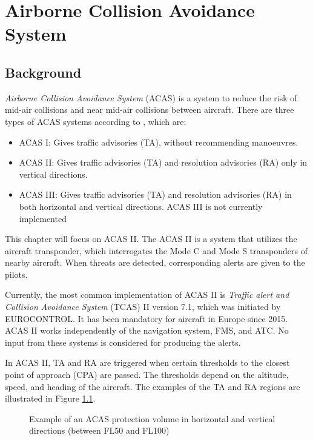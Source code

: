 \chapter{Airborne Collision Avoidance System}

\section{Background}

\emph{Airborne Collision Avoidance System} (ACAS) is a system to reduce the risk of mid-air collisions and near mid-air collisions between aircraft. There are three types of ACAS systems according to \cite{icaoA10V4}, which are:

\begin{itemize}
  \item ACAS I: Gives traffic advisories (TA), without recommending manoeuvres.
  \item ACAS II: Gives traffic advisories (TA) and resolution advisories (RA) only in vertical directions.
  \item ACAS III: Gives traffic advisories (TA) and resolution advisories (RA) in both horizontal and vertical directions. ACAS III is not currently implemented
\end{itemize}

This chapter will focus on ACAS II. The ACAS II is a system that utilizes the aircraft transponder, which interrogates the Mode C and Mode S transponders of nearby aircraft. When threats are detected, corresponding alerts are given to the pilots.

Currently, the most common implementation of ACAS II is \emph{Traffic alert and Collision Avoidance System} (TCAS) II version 7.1, which was initiated by EUROCONTROL. It has been mandatory for aircraft in Europe since 2015. ACAS II works independently of the navigation system, FMS, and ATC. No input from these systems is considered for producing the alerts.

In ACAS II, TA and RA are triggered when certain thresholds to the closest point of approach (CPA) are passed. The thresholds depend on the altitude, speed, and heading of the aircraft. The examples of the TA and RA regions are illustrated in Figure \ref{fig:acas_regions}.

\begin{figure}[ht]
  \centering
  
  \caption{Example of an ACAS protection volume in horizontal and vertical directions (between FL50 and FL100)}
  \label{fig:acas_regions}
\end{figure}





